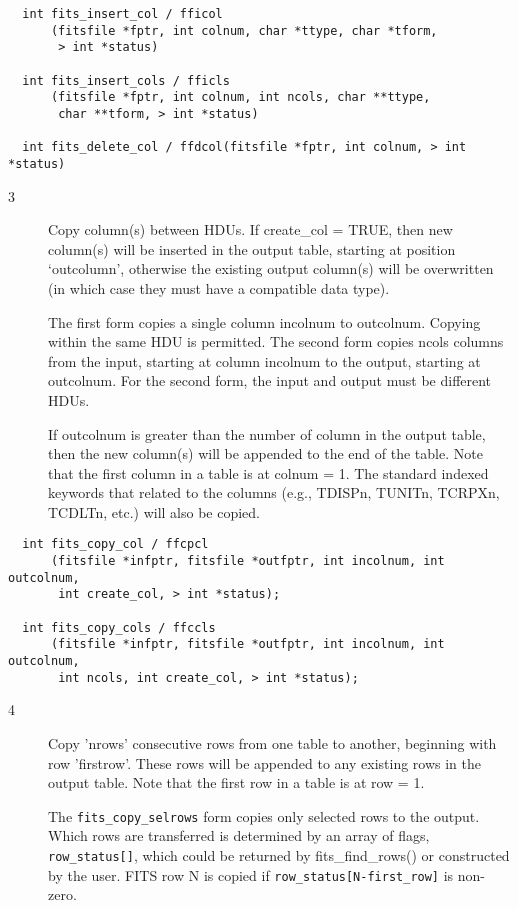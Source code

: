 \documentclass[11pt]{book}
\begin{document}
\begin{verbatim}
  int fits_insert_col / fficol
      (fitsfile *fptr, int colnum, char *ttype, char *tform,
       > int *status)

  int fits_insert_cols / fficls
      (fitsfile *fptr, int colnum, int ncols, char **ttype,
       char **tform, > int *status)

  int fits_delete_col / ffdcol(fitsfile *fptr, int colnum, > int *status)
\end{verbatim}

\begin{description}
\item[3 ] Copy column(s) between HDUs.  If create\_col = TRUE, then
    new column(s) will be inserted in the output table, starting at
    position `outcolumn', otherwise the existing output column(s) will
    be overwritten (in which case they must have a compatible data
    type).

    The first form copies a single column incolnum to outcolnum.
    Copying within the same HDU is permitted.  The second form copies
    ncols columns from the input, starting at column incolnum to the
    output, starting at outcolnum.  For the second form, the input and
    output must be different HDUs.

    If outcolnum is greater than the number of column in the output table, then
    the new column(s) will be appended to the end of the table.
    Note that the first column in a table is at colnum = 1.
    The standard indexed keywords that related to the columns (e.g., TDISPn,
    TUNITn, TCRPXn, TCDLTn, etc.) will also be copied. \label{ffcpcl} \label{ffccls}
\end{description}

\begin{verbatim}
  int fits_copy_col / ffcpcl
      (fitsfile *infptr, fitsfile *outfptr, int incolnum, int outcolnum,
       int create_col, > int *status);

  int fits_copy_cols / ffccls
      (fitsfile *infptr, fitsfile *outfptr, int incolnum, int outcolnum, 
       int ncols, int create_col, > int *status);
\end{verbatim}

\begin{description}
\item[4 ] Copy 'nrows' consecutive rows from one table to another, beginning
    with row 'firstrow'.  These rows will be appended to any existing
    rows in the output table.
   Note that the first row in a table is at row = 1. 

   The \verb|fits_copy_selrows| form copies only selected rows to the output.
   Which rows are transferred is determined by an array of flags, \verb|row_status[]|,
   which could be returned by fits_find_rows() or constructed by the user.
   FITS row N is copied if \verb|row_status[N-first_row]| is non-zero.  
   \label{ffcprw} \label{ffcpsr}
\end{description}
\end{document}
